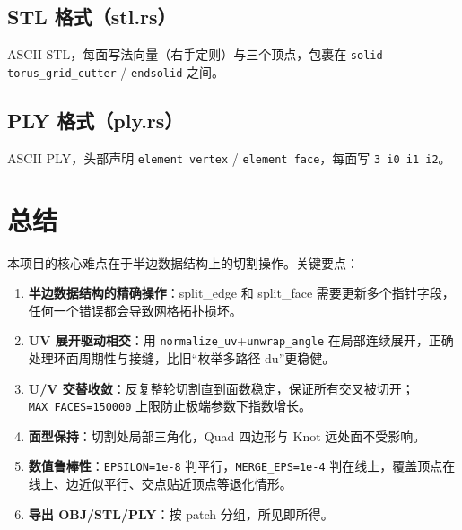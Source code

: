 \documentclass[12pt,a4paper]{article}
\begin{document}
\subsection{STL 格式（stl.rs）}

ASCII STL，每面写法向量（右手定则）与三个顶点，包裹在
\texttt{solid torus\_grid\_cutter} / \texttt{endsolid} 之间。

\subsection{PLY 格式（ply.rs）}

ASCII PLY，头部声明 \texttt{element vertex} / \texttt{element face}，每面写
\texttt{3 i0 i1 i2}。

\section{总结}

本项目的核心难点在于半边数据结构上的切割操作。关键要点：

\begin{enumerate}
\item \textbf{半边数据结构的精确操作}：split\_edge 和 split\_face 需要更新多个指针字段，任何一个错误都会导致网格拓扑损坏。
\item \textbf{UV 展开驱动相交}：用 \texttt{normalize\_uv}+\texttt{unwrap\_angle} 在局部连续展开，正确处理环面周期性与接缝，比旧“枚举多路径 du”更稳健。
\item \textbf{U/V 交替收敛}：反复整轮切割直到面数稳定，保证所有交叉被切开；\texttt{MAX\_FACES=150000} 上限防止极端参数下指数增长。
\item \textbf{面型保持}：切割处局部三角化，Quad 四边形与 Knot 远处面不受影响。
\item \textbf{数值鲁棒性}：\texttt{EPSILON=1e-8} 判平行，\texttt{MERGE\_EPS=1e-4} 判在线上，覆盖顶点在线上、边近似平行、交点贴近顶点等退化情形。
\item \textbf{导出 OBJ/STL/PLY}：按 patch 分组，所见即所得。
\end{enumerate}
\end{document}
